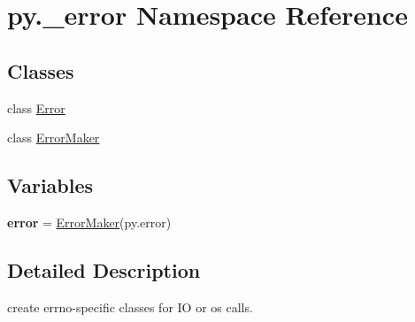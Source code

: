 \hypertarget{namespacepy_1_1__error}{}\section{py.\+\_\+error Namespace Reference}
\label{namespacepy_1_1__error}
\subsection*{Classes}
\begin{DoxyCompactItemize}
\item 
class \hyperlink{classpy_1_1__error_1_1_error}{Error}
\item 
class \hyperlink{classpy_1_1__error_1_1_error_maker}{Error\+Maker}
\end{DoxyCompactItemize}
\subsection*{Variables}
\begin{DoxyCompactItemize}
\item 
\mbox{\label{namespacepy_1_1__error_aa99fb60fdece7a55e841295e463f7070}} 
{\bfseries error} = \hyperlink{classpy_1_1__error_1_1_error_maker}{Error\+Maker}(\textquotesingle{}py.\+error\textquotesingle{})
\end{DoxyCompactItemize}


\subsection{Detailed Description}
\begin{DoxyVerb}create errno-specific classes for IO or os calls.\end{DoxyVerb}
 